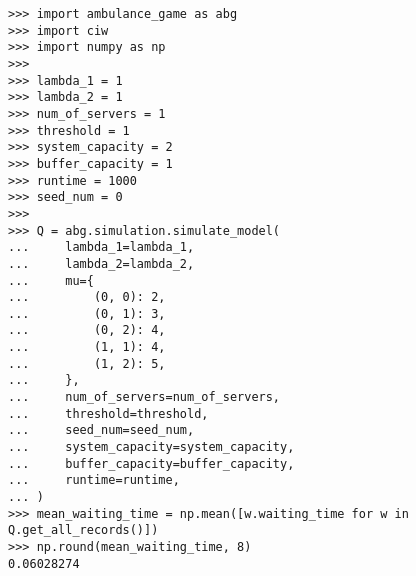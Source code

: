 \begin{lstlisting}[style=pystyle]
>>> import ambulance_game as abg
>>> import ciw
>>> import numpy as np
>>>
>>> lambda_1 = 1
>>> lambda_2 = 1
>>> num_of_servers = 1
>>> threshold = 1
>>> system_capacity = 2
>>> buffer_capacity = 1
>>> runtime = 1000
>>> seed_num = 0
>>>
>>> Q = abg.simulation.simulate_model(
...     lambda_1=lambda_1,
...     lambda_2=lambda_2,
...     mu={
...         (0, 0): 2,
...         (0, 1): 3,
...         (0, 2): 4,
...         (1, 1): 4,
...         (1, 2): 5,
...     },
...     num_of_servers=num_of_servers,
...     threshold=threshold,
...     seed_num=seed_num,
...     system_capacity=system_capacity,
...     buffer_capacity=buffer_capacity,
...     runtime=runtime,
... )
>>> mean_waiting_time = np.mean([w.waiting_time for w in Q.get_all_records()])
>>> np.round(mean_waiting_time, 8)
0.06028274

\end{lstlisting}
